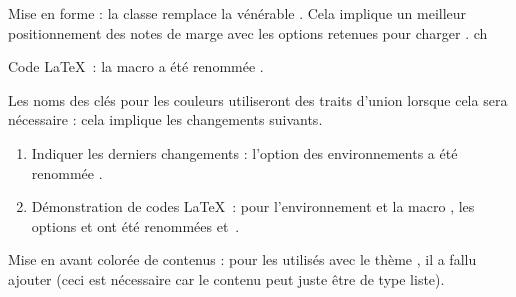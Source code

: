 \tdocsep




\begin{tdocbreak}[version = 1.7.0, date = 2024-12-04]
	\item Mise en forme : la classe  remplace la vénérable . Cela implique un meilleur positionnement des notes de marge avec les options retenues pour charger .
ch
	\item Code \LaTeX\ : la macro  a été renommée .

	\item Les noms des clés pour les couleurs utiliseront des traits d'union lorsque cela sera nécessaire : cela implique les changements suivants.
	\begin{enumerate}
		\item Indiquer les derniers changements : l'option  des environnements a été renommée .

		\item Démonstration de codes \LaTeX\ : pour l'environnement  et la macro , les options  et  ont été renommées  et \,.
	\end{enumerate}
\end{tdocbreak}


\begin{tdocfix}
	\item Mise en avant colorée de contenus : pour les  utilisés avec le thème , il a fallu ajouter  (ceci est nécessaire car le contenu peut juste être de type liste).
\end{tdocfix}


